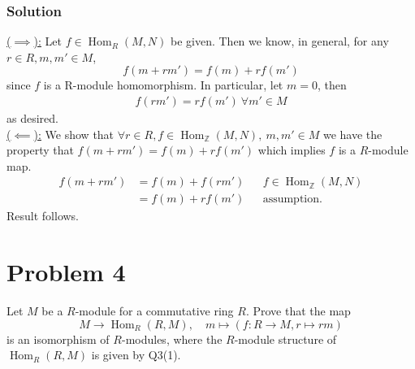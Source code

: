 \documentclass{article}
\theoremstyle{plain}
\newcommand{\Z}{\mathbb{Z}}
\DeclareMathOperator{\Hom}{Hom}
\begin{document}
\subsubsection*{Solution}
\underline{($\implies$):} Let $f\in\Hom_{R}(M,N)$ be given. Then we know, in
general, for any $r\in R, m,m'\in M$, \[f(m+rm')=f(m)+rf(m')\] since $f$ is a
R-module homomorphism. In particular, let $m=0$, then
\begin{align*} f(rm')=rf(m')\ \forall m'\in M\end{align*} as desired.
\\
\underline{($\impliedby$):} We show that $\forall r\in R,f\in\Hom_{\Z}(M,N),\ m,m'\in M$ we
have the property that $f(m+rm')=f(m)+rf(m')$ which implies $f$ is a $R$-module map.
\begin{align*}
  f(m+rm')&=f(m)+f(rm')&&f\in\Hom_{\Z}(M, N)\\
  &=f(m)+rf(m')&&\text{assumption}.
\end{align*}
Result follows.

\section*{Problem 4}
Let $M$ be a $R$-module for a commutative ring $R$. Prove that the map
\[M\to\Hom_{R}(R,M),\quad m\mapsto(f:R\to M, r\mapsto rm)\]
is an isomorphism of $R$-modules, where the $R$-module structure of
$\Hom_{R}(R,M)$ is given by Q3(1).
\end{document}
